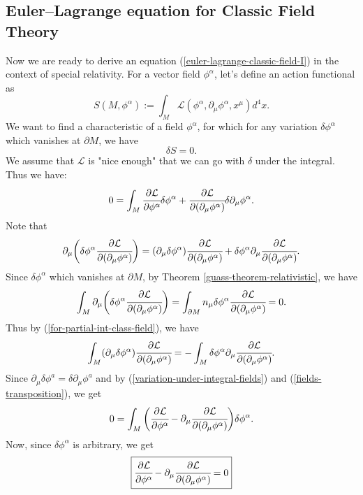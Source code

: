 \documentclass[main.tex]{subfiles}
\begin{document}
\subsection{Euler–Lagrange equation for Classic Field Theory}
Now we are ready to derive an equation (\ref{euler-lagrange-classic-field-I}) in the context of special relativity.
For a vector field $\phi^\alpha$, let's define an action functional as 
\begin{equation}
S(M, \phi^\alpha) := \int_M \mathcal{L}(\phi^\alpha, \partial_\mu \phi^\alpha, x^\mu) d^4x.
\end{equation}
We want to find a characteristic of a field $\phi^\alpha$, for which for any variation $\delta \phi^\alpha$ which vanishes at $\partial M$, we have
\begin{equation}
\delta S = 0.
\end{equation}
We assume that $\mathcal{L}$ is "nice enough" that we can go with $\delta$ under the integral. Thus we have:
\begin{equation}
\label{variation-under-integral-fields}
0 = \int_M \cfrac{\partial \mathcal{L}}{\partial \phi^\alpha} \delta \phi^\alpha + \cfrac{\partial \mathcal{L}}{\partial (\partial_\mu \phi^\alpha)} \delta \partial_\mu \phi^\alpha.
\end{equation}
Note that 
\begin{equation}
\label{for-partial-int-class-field}
\partial_\mu \bigg( \delta\phi^\alpha \cfrac{\partial \mathcal{L}}{\partial (\partial_\mu \phi^\alpha)}\bigg) = (\partial_\mu\delta\phi^\alpha)\cfrac{\partial \mathcal{L}}{\partial (\partial_\mu \phi^\alpha)}
+ \delta\phi^\alpha \partial_\mu \cfrac{\partial \mathcal{L}}{\partial (\partial_\mu \phi^\alpha)}.
\end{equation}
Since $\delta \phi^\alpha$ which vanishes at $\partial M$, by Theorem \ref{guass-theorem-relativistic}, we have
\begin{equation}
\int_M \partial_\mu \bigg( \delta\phi^\alpha \cfrac{\partial \mathcal{L}}{\partial (\partial_\mu \phi^\alpha)}\bigg) = \int_{\partial M} n_\mu \delta\phi^\alpha \cfrac{\partial \mathcal{L}}{\partial (\partial_\mu \phi^\alpha)} = 0.
\end{equation}
Thus by (\ref{for-partial-int-class-field}), we have
\begin{equation}
\label{fields-transposition}
\int_M (\partial_\mu\delta\phi^\alpha)\cfrac{\partial \mathcal{L}}{\partial (\partial_\mu \phi^\alpha)} = - \int_M \delta\phi^\alpha \partial_\mu \cfrac{\partial \mathcal{L}}{\partial (\partial_\mu \phi^\alpha)}.
\end{equation}
Since $\partial_\mu \delta \phi^a = \delta \partial_\mu \phi^a$ and by (\ref{variation-under-integral-fields}) and (\ref{fields-transposition}), we get
\begin{equation}
0 = \int_M \bigg(\cfrac{\partial \mathcal{L}}{\partial \phi^\alpha}  - \partial_\mu \cfrac{\partial \mathcal{L}}{\partial (\partial_\mu \phi^\alpha)}\bigg) \delta \phi^\alpha.
\end{equation}
Now, since $\delta \phi^\alpha$ is arbitrary, we get
\begin{equation}
\boxed{
\cfrac{\partial \mathcal{L}}{\partial \phi^\alpha}  - \partial_\mu \cfrac{\partial \mathcal{L}}{\partial (\partial_\mu \phi^\alpha)} = 0
}
\end{equation}
\end{document}

